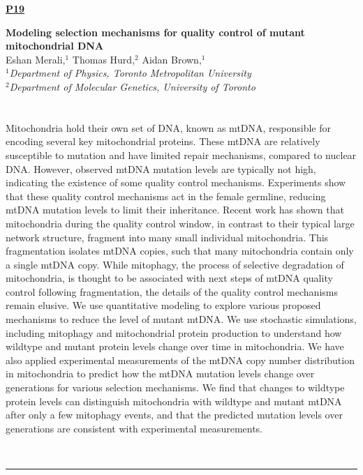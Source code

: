 \documentclass[titlepage,oneside,openany,10pt]{book}
\newenvironment{posterabs}[4] %
        {
	\begin{flushright}
                \underline{\textbf{#4}}
        \end{flushright}
        \textbf{#1}\\%
        #2\\%
        \textit{#3}\\\\%
        }
        {
        \\
        \noindent\rule{15cm}{0.5pt}%
        }
\begin{document}
\begin{posterabs}
	{Modeling selection mechanisms for quality control of mutant mitochondrial DNA}
	{Eshan Merali,$^{1}$ Thomas Hurd,$^{2}$ Aidan Brown,$^{1}$}
	{
	$^1$Department of Physics, Toronto Metropolitan University\\
	$^2$Department of Molecular Genetics, University of Toronto\\
	}
	{P19}
	Mitochondria hold their own set of DNA, known as mtDNA, responsible for encoding several key mitochondrial proteins. These mtDNA are relatively susceptible to mutation and have limited repair mechanisms, compared to nuclear DNA. However, observed mtDNA mutation levels are typically not high, indicating the existence of some quality control mechanisms. Experiments show that these quality control mechanisms act in the female germline, reducing mtDNA mutation levels to limit their inheritance. Recent work has shown that mitochondria during the quality control window, in contrast to their typical large network structure, fragment into many small individual mitochondria. This fragmentation isolates mtDNA copies, such that many mitochondria contain only a single mtDNA copy. While mitophagy, the process of selective degradation of mitochondria, is thought to be associated with next steps of mtDNA quality control following fragmentation, the details of the quality control mechanisms remain elusive. We use quantitative modeling to explore various proposed mechanisms to reduce the level of mutant mtDNA. We use stochastic simulations, including mitophagy and mitochondrial protein production to understand how wildtype and mutant protein levels change over time in mitochondria. We have also applied experimental measurements of the mtDNA copy number distribution in mitochondria to predict how the mtDNA mutation levels change over generations for various selection mechanisms. We find that changes to wildtype protein levels can distinguish mitochondria with wildtype and mutant mtDNA after only a few mitophagy events, and that the predicted mutation levels over generations are consistent with experimental measurements.
	\label{MeraliE}
\end{posterabs}

\newpage
\end{document}
